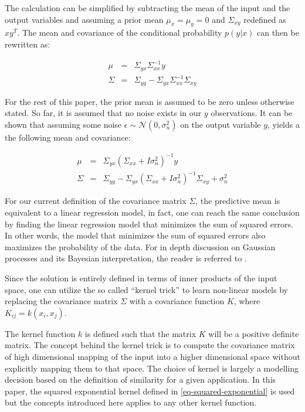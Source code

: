 \documentclass[useAMS,usenatbib,fleqn]{mn2e}
\begin{document}
The calculation can be simplified by subtracting the mean of the input and the output variables and assuming a prior mean $\mu_{x}=\mu_{y}=0$ and $\Sigma_{xy}$ redefined as $xy^{T}$. The mean and covariance of the conditional probability $p(y|x)$ can then be rewritten as:

\begin{equation}
\label{eq-conditional-zero-mean}
\begin{array}{rcl}
\mu &=& \Sigma_{yx}\Sigma_{xx}^{-1}y\\
\Sigma &=& \Sigma_{yy}-\Sigma_{yx}\Sigma_{xx}^{-1}\Sigma_{xy}
\end{array}
\end{equation}

For the rest of this paper, the prior mean is assumed to be zero unless otherwise stated. So far, it is assumed that no noise exists in our $y$ observations. It can be shown that assuming some noise $\epsilon \sim \mathcal{N}\left(0,\sigma_{n}^{2}\right)$ on the output variable $y$, yields a the following mean and covariance:

\begin{equation}
\label{eq-mean-variance-noise}
\begin{array}{rcl}
\mu &=& \Sigma_{yx}\left(\Sigma_{xx}+I\sigma_{n}^{2}\right)^{-1}y\\
\Sigma &=& \Sigma_{yy}-\Sigma_{yx}\left(\Sigma_{xx}+I\sigma_{n}^{2}\right)^{-1}\Sigma_{xy}+\sigma_{n}^{2}
\end{array}
\end{equation}

For our current definition of the covariance matrix $\Sigma$, the predictive mean is equivalent to a linear regression model, in fact, one can reach the same conclusion by finding the linear regression model that minimizes the sum of squared errors. In other words, the model that minimizes the sum of squared errors also maximizes the probability of the data. For in depth discussion on Gaussian processes and its Bayesian interpretation, the reader is referred to \cite{}.

Since the solution is entirely defined in terms of inner products of the input space, one can utilize the so called ``kernel trick'' to learn non-linear models by replacing the covariance matrix $\Sigma$ with a covariance function $K$, where $K_{ij} = k(x_{i},x_{j})$.

The kernel function $k$ is defined such that the matrix $K$ will be a positive definite matrix. The concept behind the kernel trick is to compute the covariance matrix of high dimensional mapping of the input into a higher dimensional space without explicitly mapping them to that space. The choice of kernel is largely a modelling decision based on the definition of similarity for a given application. In this paper, the squared exponential kernel defined in \eqref{eq-squared-exponential} is used but the concepts introduced here applies to any other kernel function.
\end{document}
